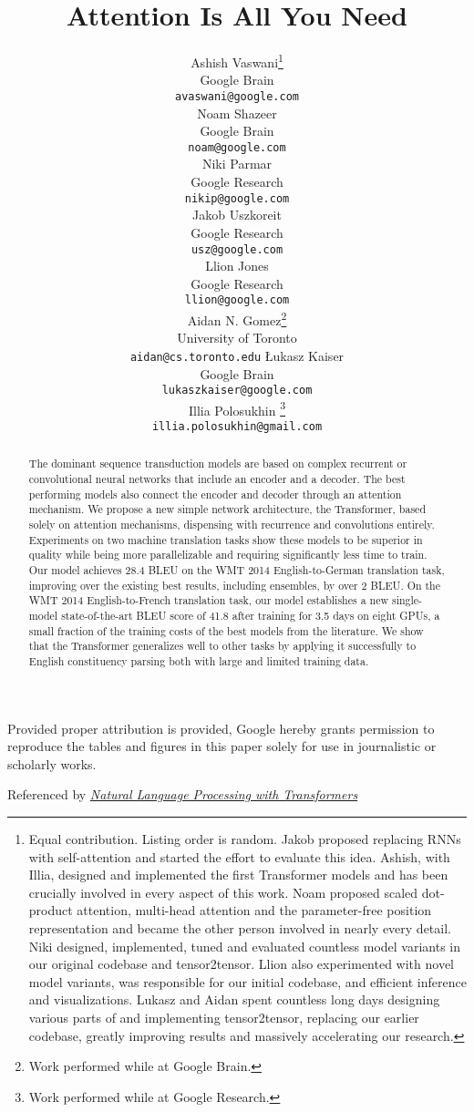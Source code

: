 \documentclass{article}
\title{Attention Is All You Need}
\author{
  \AND
  Ashish Vaswani\thanks{Equal contribution. Listing order is random. Jakob proposed replacing RNNs with self-attention and started the effort to evaluate this idea.
Ashish, with Illia, designed and implemented the first Transformer models and has been crucially involved in every aspect of this work. Noam proposed scaled dot-product attention, multi-head attention and the parameter-free position representation and became the other person involved in nearly every detail. Niki designed, implemented, tuned and evaluated countless model variants in our original codebase and tensor2tensor. Llion also experimented with novel model variants, was responsible for our initial codebase, and efficient inference and visualizations. Lukasz and Aidan spent countless long days designing various parts of and implementing tensor2tensor, replacing our earlier codebase, greatly improving results and massively accelerating our research.
}\\
  Google Brain\\
  \texttt{avaswani@google.com}\\
  \And
  Noam Shazeer\footnotemark[1]\\
  Google Brain\\
  \texttt{noam@google.com}\\
  \And
  Niki Parmar\footnotemark[1]\\
  Google Research\\
  \texttt{nikip@google.com}\\  
  \And
  Jakob Uszkoreit\footnotemark[1]\\
  Google Research\\
  \texttt{usz@google.com}\\
  \And  
  Llion Jones\footnotemark[1]\\
  Google Research\\
  \texttt{llion@google.com}\\   
  \And
  Aidan N. Gomez\footnotemark[1] \hspace{1.7mm}\thanks{Work performed while at Google Brain.}\\
  University of Toronto\\
  \texttt{aidan@cs.toronto.edu}
  \And
  {\L}ukasz Kaiser\footnotemark[1]\\
  Google Brain\\
  \texttt{lukaszkaiser@google.com}\\
  \And
  Illia Polosukhin\footnotemark[1]\hspace{1.7mm} \thanks{Work performed while at Google Research.}\\
  \texttt{illia.polosukhin@gmail.com}\\  
}
\begin{document}
\begin{center}
    \color{red}
    \large Provided proper attribution is provided, Google hereby grants permission to reproduce the tables and figures in this paper solely for use in journalistic or scholarly works.

    Referenced by \href{https://trello.com/c/KWikzXQL}{\textit{Natural Language Processing with Transformers}}
\end{center}

\maketitle

\begin{abstract}
The dominant sequence transduction models are based on complex recurrent or convolutional neural networks that include an encoder and a decoder. The best performing models also connect the encoder and decoder through an attention mechanism. We propose a new simple network architecture, the Transformer, based solely on attention mechanisms, dispensing with recurrence and convolutions entirely. Experiments on two machine translation tasks show these models to be superior in quality while being  more parallelizable and requiring significantly less time to train. Our model achieves 28.4 BLEU on the WMT 2014 English-to-German translation task, improving over the existing best results, including ensembles, by over 2 BLEU.  On the WMT 2014 English-to-French translation task, our model establishes a new single-model state-of-the-art BLEU score of 41.8 after training for 3.5 days on eight GPUs, a small fraction of the training costs of the best models from the literature. We show that the Transformer generalizes well to other tasks by applying it successfully to English constituency parsing  both with large and limited training data.



\end{abstract}
\end{document}
